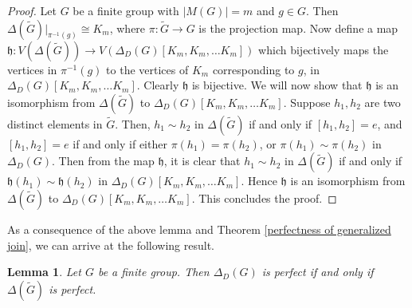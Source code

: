 \documentclass[12pt,a4paper]{article}
\newtheorem{lemma}[theorem]{Lemma}
\begin{document}
\begin{proof}
Let $G$ be a finite group with $\lvert M(G)\rvert=m$ and $g\in G$. Then $\Delta(\tilde{G})\vert_{\pi^{-1}(g)}\cong K_m$, where $\pi:\tilde{G}\rightarrow G$ is the projection map. Now define a map $\mathfrak{h}:V(\Delta(\tilde{G})) \rightarrow V(\Delta_D(G)[K_m,K_m,\dots K_m])$ which bijectively maps the vertices in $\pi^{-1}(g)$ to the vertices of $K_m$ corresponding to $g$, in $\Delta_D(G)[K_m,K_m,\dots K_m]$. Clearly $\mathfrak{h}$ is bijective. We will now show that $\mathfrak{h}$ is an isomorphism from $\Delta(\tilde{G})$ to $\Delta_D(G)[K_m,K_m,\dots K_m]$. Suppose $h_1, h_2$ are two distinct elements in $\tilde{G}$. Then, $h_1\sim h_2$ in $\Delta(\tilde{G})$ if and only if $[h_1,h_2]=e$, and $[h_1,h_2]=e$ if and only if either $\pi(h_1)=\pi(h_2)$, or $\pi(h_1)\sim\pi(h_2)$ in $\Delta_D(G)$. Then from the map $\mathfrak{h}$, it is clear that $h_1\sim h_2$ in $\Delta(\tilde{G})$ if and only if $\mathfrak{h}(h_1)\sim \mathfrak{h}(h_2)$ in $\Delta_D(G)[K_m,K_m,\dots K_m]$. Hence $\mathfrak{h}$ is an isomorphism from $\Delta(\tilde{G})$ to $\Delta_D(G)[K_m,K_m,\dots K_m]$. This concludes the proof.  
\end{proof}

As a consequence of the above lemma and Theorem \ref{perfectness of generalized join}, we can arrive at the following result.

\begin{lemma}\label{perfectness of commuting graph}
Let $G$ be a finite group. Then $\Delta_D(G)$ is perfect if and only if $\Delta(\tilde{G})$ is perfect.    
\end{lemma}
\end{document}

